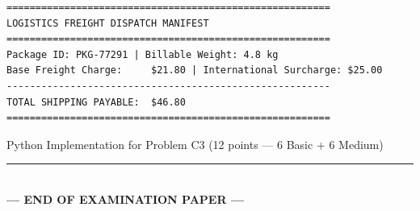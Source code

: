 \documentclass[11pt,a4paper]{article}
\begin{document}
\begin{lstlisting}[basicstyle=\ttfamily\scriptsize]
========================================================
LOGISTICS FREIGHT DISPATCH MANIFEST
========================================================
Package ID: PKG-77291 | Billable Weight: 4.8 kg
Base Freight Charge:     $21.80 | International Surcharge: $25.00
--------------------------------------------------------
TOTAL SHIPPING PAYABLE:  $46.80
========================================================
\end{lstlisting}

\begin{answerbox}[height=11.0cm]{Python Implementation for Problem C3 (12 points --- 6 Basic + 6 Medium)}
\end{answerbox}

\vfill
\begin{center}
  \rule{0.5\textwidth}{0.4pt}\\[0.8mm]
  \textbf{\color{primaryblue}--- END OF EXAMINATION PAPER ---}
\end{center}
\end{document}
